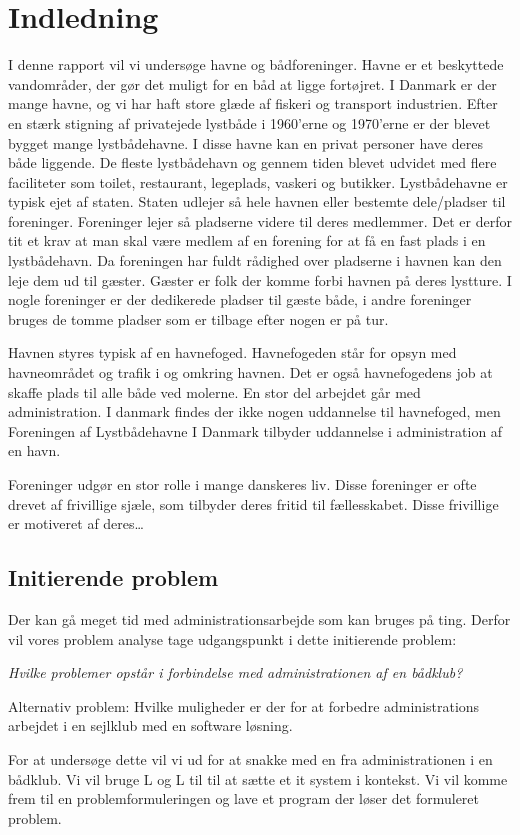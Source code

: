 \chapter{Indledning}
I denne rapport vil vi undersøge havne og bådforeninger. Havne er et beskyttede vandområder, der gør det muligt for en båd at ligge fortøjret. I Danmark er der mange havne, og vi har haft store glæde af fiskeri og transport industrien. Efter en stærk stigning af privatejede lystbåde i 1960'erne og 1970'erne er der blevet bygget mange lystbådehavne. I disse havne kan en privat personer have deres både liggende. De fleste lystbådehavn og gennem tiden blevet udvidet med flere faciliteter som toilet, restaurant, legeplads, vaskeri og butikker. Lystbådehavne er typisk ejet af staten. Staten udlejer så hele havnen eller bestemte dele/pladser til foreninger. Foreninger lejer så pladserne videre til deres medlemmer. Det er derfor tit et krav at man skal være medlem af en forening for at få en fast plads i en lystbådehavn. Da foreningen har fuldt rådighed over pladserne i havnen kan den leje dem ud til gæster. Gæster er folk der komme forbi havnen på deres lystture. I nogle foreninger er der dedikerede pladser til gæste både, i andre foreninger bruges de tomme pladser som er tilbage efter nogen er på tur.  

Havnen styres typisk af en havnefoged. Havnefogeden står for opsyn med havneområdet og trafik i og omkring havnen. Det er også havnefogedens job at skaffe plads til alle både ved molerne. En stor del arbejdet går med administration. I danmark findes der ikke nogen uddannelse til havnefoged, men Foreningen af Lystbådehavne I Danmark tilbyder uddannelse i administration af en havn.

Foreninger udgør en stor rolle i mange danskeres liv. Disse foreninger er ofte drevet af frivillige sjæle, som tilbyder deres fritid til fællesskabet. Disse frivillige er motiveret af deres…

\section{Initierende problem}

Der kan gå meget tid med administrationsarbejde som kan bruges på ting. Derfor vil vores problem analyse tage udgangspunkt i dette initierende problem:

\textit{Hvilke problemer opstår i forbindelse med administrationen af en bådklub?}

Alternativ problem:
Hvilke muligheder er der for at forbedre administrations arbejdet i en sejlklub med en software løsning.

For at undersøge dette vil vi ud for at snakke med en fra administrationen i en bådklub. Vi vil bruge L og L til til at sætte et it system i kontekst. Vi vil komme frem til en problemformuleringen og lave et program der løser det formuleret problem.

